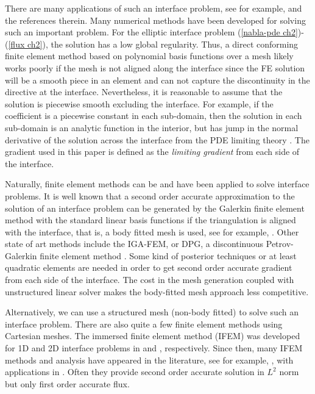 \documentclass[11pt]{article}
\numberwithin{equation}{section}
\begin{document}
There are many  applications of such an interface problem, see for example,
\cite{sutton1995interfaces, zienkiewicz2000finite, li2006immersed}
and the references therein.
Many numerical methods have been developed for solving such an important problem.
For the elliptic interface problem (\ref{nabla-pde ch2})-(\ref{flux ch2}),
the solution has a low global regularity.
Thus, a direct conforming finite element method based on polynomial basis functions over a mesh likely works poorly
if the mesh  is not aligned  along the interface since the FE solution will be a smooth piece in an element
and can not capture the discontinuity in the directive at the interface.
Nevertheless,  it is reasonable to assume that the solution is piecewise smooth excluding the interface.
For example, if the coefficient is a piecewise constant in each sub-domain,
then the solution in each sub-domain is an analytic function in the interior,
but has jump in the normal derivative of the solution across the interface from the PDE limiting theory \cite{kevorkian1990partial}.
The gradient used in this paper is defined as the \emph{limiting gradient} from each side of the interface.

Naturally, finite element methods can be and have been applied to solve interface problems.
It is well known that a second order accurate approximation to the solution
of an interface problem  can be generated by the Galerkin finite element method
with the standard linear basis functions
if the triangulation is aligned with the interface,
that is, a body fitted mesh is used, see for example,
\cite{babuska1970finite, bramble1996finite, chen1998finite, xu1982error}.
Other state of art methods include the IGA-FEM,
or DPG, 
a discontinuous Petrov-Galerkin finite element method \cite{carstensena2014low}.
Some kind of posterior techniques or at least quadratic elements are needed
in order to get second order accurate gradient from each side of the interface.
The cost in the mesh generation coupled with unstructured linear solver
makes the body-fitted mesh approach less competitive.

Alternatively, we can use a structured mesh (non-body fitted) to solve such an interface problem.
There are also quite a few finite element methods using Cartesian meshes.
The immersed finite element method (IFEM) was developed for 1D and 2D interface problems
in \cite{li1998immersed} and \cite{li2003new}, respectively.
Since then, many IFEM methods and analysis have appeared in the literature,
see for example, \cite{chou2010optimal, he2010immersed},
with applications in \cite{lin2012linear, yang2003immersed}.
Often they provide second order accurate solution in $L^2$ norm but only first order accurate flux.
\end{document}
